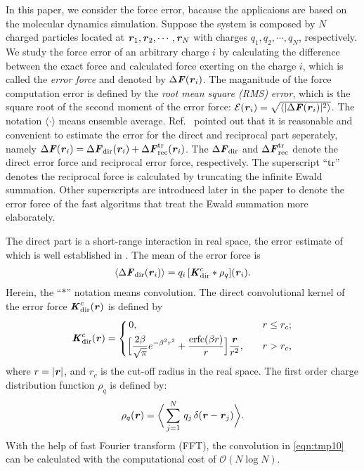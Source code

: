 \documentclass[aps,pre,preprint]{revtex4}
\renewcommand{\v}[1]{\textbf{\textit{#1}}}
\begin{document}
In this paper, we consider the force error, bacause the applicaions
are based on the molecular dynamics simulation.  Suppose the system is
composed by $N$ charged particles located at $\v r_1, \v r_2, \cdots,
\v r_N$ with charges $q_1, q_2, \cdots, q_N$, respectively.  We study
the force error of an arbitrary charge $i$ by calculating the
difference between the exact force and calculated force exerting on
the charge $i$, which is called the \emph{error force}
\cite{wang2012} and denoted by $\Delta \v F(\v r_i)$.
The maganitude of the force computation error 
is defined by the \emph{root mean square (RMS)} \emph{error}, which is
the square root of the second moment of the error force: $\mathcal
E(\v r_i) = \sqrt{\langle\vert\Delta\v F(\v r_i)\vert^2\rangle}$.  The
notation $\langle\cdot\rangle$ means ensemble average.
Ref.~\cite{wang2010optimizing} pointed out that it is reasonable and
convenient to estimate the error for the direct and reciprocal part
seperately, namely $\Delta\v F(\v r_i) = \Delta\v F_{\textrm{dir}}(\v
r_i) + \Delta\v F^{\textrm{tr}}_{\textrm{rec}}(\v r_i)$.  The
$\Delta\v F_{\textrm{dir}}$ and $ \Delta\v
F^{\textrm{tr}}_{\textrm{rec}}$ denote the direct error force and
reciprocal error force, respectively.  The superscript ``tr'' denotes
the reciprocal force is calculated by truncating the infinite Ewald
summation. Other superscripts are introduced later in the paper to
denote the error force of the fast algoritms
that treat the Ewald summation more elaborately.

The direct part is a short-range
interaction in real space, the error estimate of which
is well established in \cite{wang2012}.
The mean of the error force is
\begin{align}\label{eqn:tmp10}
  \langle\Delta\v F_{\textrm{dir}}(\v r_i)\rangle
  =q_i\, [\v K^c_{\textrm{dir}}\ast\rho_q](\v r_i).
\end{align}
Herein, the ``$\ast$'' notation means convolution.  The direct
convolutional kernel of the error force $\v K^c_{\textrm{dir}}(\v r)$
is defined by
\begin{align}
  \v K^c_{\textrm{dir}}(\v r) =
  \left\{
    \begin{aligned}
      &\,0, &\quad & r \leq r_c;\\
      &
      \Big[
      \frac{2\beta}{\sqrt\pi} e^{-\beta^2r^2} + \frac{\textrm{erfc}(\beta r)}{r}
      \Big]\frac{\v r}{r^2}
      ,& & r > r_c,
    \end{aligned}
  \right.
\end{align}
where $r = \vert\v r\vert$, and  $r_c$ is the cut-off radius in the real space.  The first order
charge distribution function $\rho_q$ is defined by:
\begin{align}
  \rho_q(\v r) = 
  \bigg\langle
  \sum_{j = 1}^N
  \,q_j\,\delta(\v r - \v r_j)
  \bigg\rangle.
\end{align}
With the help of fast Fourier transform (FFT), the convolution in
\eqref{eqn:tmp10} can be calculated with the computational cost of
$\mathcal O(N\log N)$.
\end{document}
